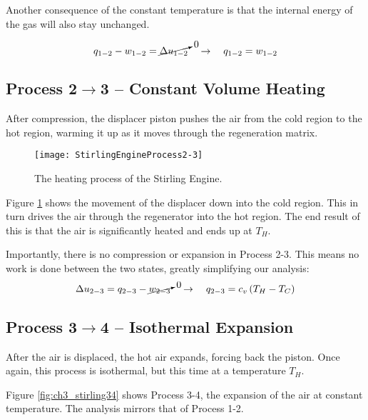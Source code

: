 Another consequence of the constant temperature is that the internal energy of the gas will also stay unchanged.

\begin{equation}
  q_{1-2} - w_{1-2} = \cancelto{0}{\Delta u_{1-2}} \quad \rightarrow \quad q_{1-2} = w_{1-2}
\end{equation}

\subsection{Process 2$\rightarrow$3 -- Constant Volume Heating}

After compression, the displacer piston pushes the air from the cold region to the hot region, warming it up as it moves through the regeneration matrix.

\begin{figure}[H]
\centering
\texttt{[image: StirlingEngineProcess2-3]}
\caption{The heating process of the Stirling Engine.}
\label{fig:ch3_stirling23}
\end{figure}


Figure \ref{fig:ch3_stirling23} shows the movement of the displacer down into the cold region.  This in turn drives the air through the regenerator into the hot region.  The end result of this is that the air is significantly heated and ends up at $T_H$.

Importantly, there is no compression or expansion in Process 2-3.  This means no work is done between the two states, greatly simplifying our analysis:
\begin{equation} \label{eq:stirlingRegenerator}
  \Delta u_{2-3} = q_{2-3} - \cancelto{0}{w_{2-3}} \quad \rightarrow \quad q_{2-3} = c_v \left(T_H - T_C\right)
\end{equation}

\subsection{Process 3$\rightarrow$4 -- Isothermal Expansion}

After the air is displaced, the hot air expands, forcing back the piston.  Once again, this process is isothermal, but this time at a temperature $T_H$.

Figure \ref{fig:ch3_stirling34} shows Process 3-4, the expansion of the air at constant temperature.  The analysis mirrors that of Process 1-2.

